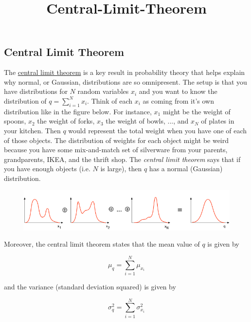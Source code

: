\documentclass[11pt]{article}
\title{Central-Limit-Theorem}
\makeatletter
\def\maxwidth{\ifdim\Gin@nat@width>\linewidth\linewidth
    \else\Gin@nat@width\fi}
\let\Oldincludegraphics\includegraphics
\renewcommand{\includegraphics}[1]{\Oldincludegraphics[width=.8\maxwidth]{#1}}
\makeatother
\begin{document}
    
    
    \maketitle
    
    

    
    \subsection{Central Limit Theorem}\label{central-limit-theorem}

The \href{https://en.wikipedia.org/wiki/Central_limit_theorem}{central
limit theorem} is a key result in probability theory that helps explain
why normal, or Gaussian, distributions are so omnipresent. The setup is
that you have distributions for \(N\) random variables \(x_i\) and you
want to know the distribution of \(q = \sum_{i=1}^{N} x_i\). Think of
each \(x_i\) as coming from it's own distribution like in the figure
below. For instance, \(x_1\) might be the weight of spoons, \(x_2\) the
weight of forks, \(x_3\) the weight of bowls, ..., and \(x_N\) of plates
in your kitchen. Then \(q\) would represent the total weight when you
have one of each of those objects. The distribution of weights for each
object might be weird because you have some mix-and-match set of
silverware from your parents, grandparents, IKEA, and the thrift shop.
The \emph{central limit theorem} says that if you have enough objects
(i.e. \(N\) is large), then \(q\) has a normal (Gaussian) distribution.

\begin{figure}
\centering
\includegraphics{Central_limit_theorem.png}
\caption{}
\end{figure}

Moreover, the central limit theorem states that the mean value of \(q\)
is given by

\begin{equation}
\mu_{q} = \sum_{i=1}^{N} \mu_{x_i} 
\end{equation}

and the variance (standard deviation squared) is given by

\begin{equation}
\sigma_{q}^{2} = \sum_{i=1}^{N} \sigma^2_{x_i} 
\end{equation}
\end{document}
